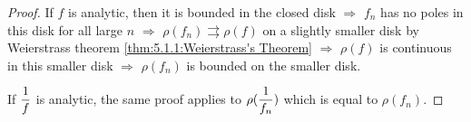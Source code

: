 \begin{proof}
    If  $ f  $ is analytic, then it is bounded in the closed disk $ \Rightarrow $  $ f_n $ has no  poles in this disk for all large  $ n  $ $ \Rightarrow $  $ \rho(f_n)\rightrightarrows \rho(f) $ on a slightly smaller disk by Weierstrass theorem \ref{thm:5.1.1:Weierstrass's Theorem} $ \Rightarrow  $  $ \rho(f)  $ is continuous in this smaller disk $ \Rightarrow  $  $ \rho(f_n ) $ is bounded on the smaller disk.
    
    If  $ \displaystyle\frac{1}{f} $ is analytic, the same proof applies to  $ \rho(\displaystyle\frac{1}{f_n}) $ which is equal to  $ \rho(f_n) $.   
\end{proof}
